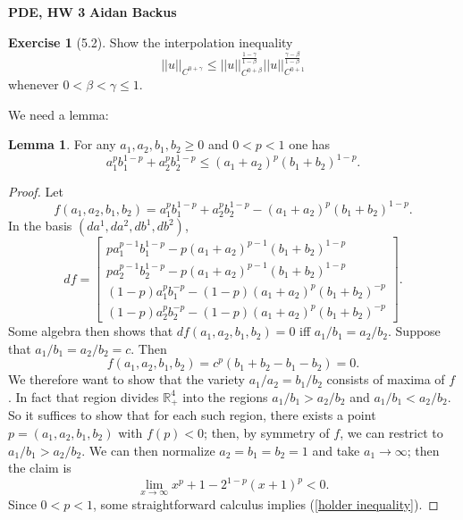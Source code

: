 \documentclass[10pt]{article}
\newcommand{\RR}{\mathbb{R}}
\theoremstyle{definition}
\newtheorem{exer}{Exercise}
\newtheorem{lemma}{Lemma}[exer]
\begin{document}
\noindent
\large\textbf{PDE, HW 3} \hfill \textbf{Aidan Backus} \\


\begin{exer}[5.2]
Show the interpolation inequality
$$||u||_{C^{0+\gamma}} \leq ||u||_{C^{0+\beta}}^{\frac{1-\gamma}{1-\beta}} ||u||_{C^{0+1}}^{\frac{\gamma-\beta}{1-\beta}}$$
whenever $0 < \beta < \gamma \leq 1$.
\end{exer}

We need a lemma:
\begin{lemma}
For any $a_1,a_2,b_1,b_2 \geq 0$ and $0 < p < 1$ one has
$$a_1^p b_1^{1-p} + a_2^p b_2^{1-p} \leq (a_1 + a_2)^p (b_1 + b_2)^{1-p}.$$
\end{lemma}
\begin{proof}
Let
$$f(a_1, a_2, b_1, b_2) = a_1^p b_1^{1-p} + a_2^p b_2^{1-p} - (a_1+a_2)^p (b_1+b_2)^{1-p}.$$
In the basis $(da^1, da^2, db^1, db^2)$,
$$df = \begin{bmatrix}
pa_1^{p-1} b_1^{1-p} - p(a_1 + a_2)^{p-1}(b_1 + b_2)^{1-p}\\
pa_2^{p-1} b_2^{1-p} - p(a_1 + a_2)^{p-1}(b_1 + b_2)^{1-p}\\
(1-p)a_1^p b_1^{-p} - (1-p)(a_1 + a_2)^p(b_1 + b_2)^{-p}\\
(1-p)a_2^p b_2^{-p} - (1-p)(a_1 + a_2)^p(b_1 + b_2)^{-p}
\end{bmatrix}.$$
Some algebra then shows that $df(a_1, a_2, b_1, b_2) = 0$ iff $a_1/b_1 = a_2/b_2$.
Suppose that $a_1/b_1 = a_2/b_2 = c$. Then
$$f(a_1, a_2, b_1, b_2) = c^p(b_1 + b_2 - b_1 - b_2) = 0.$$
We therefore want to show that the variety $a_1/a_2 = b_1/b_2$ consists of maxima of $f$.
In fact that region divides $\RR^4_+$ into the regions $a_1/b_1 > a_2/b_2$ and $a_1/b_1 < a_2/b_2$.
So it suffices to show that for each such region, there exists a point $p = (a_1, a_2, b_1, b_2)$ with $f(p) < 0$; then, by symmetry of $f$, we can restrict to $a_1/b_1 > a_2/b_2$.
We can then normalize $a_2 = b_1 = b_2 = 1$ and take $a_1 \to \infty$; then the claim is
\begin{equation}
\label{holder inequality}
\lim_{x \to \infty} x^p + 1 - 2^{1-p}(x+1)^p < 0.
\end{equation}
Since $0 < p < 1$, some straightforward calculus implies (\ref{holder inequality}).
\end{proof}
\end{document}
